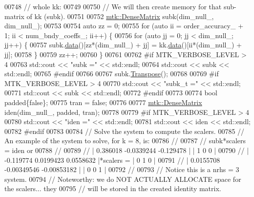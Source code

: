 \begin{DoxyCode}
{{00748   \textcolor{comment}{// whole kk:}
00749 
00750   \textcolor{comment}{// We will then create memory for that sub-matrix of kk (subk).}
00751 
00752   \hyperlink{classmtk_1_1DenseMatrix}{mtk::DenseMatrix} subk(dim\_null\_, dim\_null\_);
00753 
00754   \textcolor{keyword}{auto} zz = 0;
00755   \textcolor{keywordflow}{for} (\textcolor{keyword}{auto} ii = order\_accuracy\_ + 1; ii < num\_bndy\_coeffs\_; ii++) \{
00756     \textcolor{keywordflow}{for} (\textcolor{keyword}{auto} jj = 0; jj < dim\_null\_; jj++) \{
00757       subk.\hyperlink{classmtk_1_1DenseMatrix_a0c33b8a9e01d157c61ddbdf807c25d84}{data}()[zz*(dim\_null\_) + jj] = kk.\hyperlink{classmtk_1_1DenseMatrix_a0c33b8a9e01d157c61ddbdf807c25d84}{data}()[ii*(dim\_null\_) + jj];
00758     \}
00759     zz++;
00760   \}
00761 
00762 \textcolor{preprocessor}{  #if MTK\_VERBOSE\_LEVEL > 4}
00763   std::cout << \textcolor{stringliteral}{"subk ="} << std::endl;
00764   std::cout << subk << std::endl;
00765 \textcolor{preprocessor}{  #endif}
00766 
00767   subk.\hyperlink{classmtk_1_1DenseMatrix_a71d9c07ca66e88d97d1fd5012f43138b}{Transpose}();
00768 
00769 \textcolor{preprocessor}{  #if MTK\_VERBOSE\_LEVEL > 4}
00770   std::cout << \textcolor{stringliteral}{"subk\_t ="} << std::endl;
00771   std::cout << subk << std::endl;
00772 \textcolor{preprocessor}{  #endif}
00773 
00774   \textcolor{keywordtype}{bool} padded\{\textcolor{keyword}{false}\};
00775   tran = \textcolor{keyword}{false};
00776 
00777   \hyperlink{classmtk_1_1DenseMatrix}{mtk::DenseMatrix} iden(dim\_null\_, padded, tran);
00778 
00779 \textcolor{preprocessor}{  #if MTK\_VERBOSE\_LEVEL > 4}
00780   std::cout << \textcolor{stringliteral}{"iden ="} << std::endl;
00781   std::cout << iden << std::endl;
00782 \textcolor{preprocessor}{  #endif}
00783 
00784   \textcolor{comment}{// Solve the system to compute the scalers.}
00785   \textcolor{comment}{// An example of the system to solve, for k = 8, is:}
00786   \textcolor{comment}{//}
00787   \textcolor{comment}{// subk*scalers = iden or}
00788   \textcolor{comment}{//}
00789   \textcolor{comment}{// |  0.386018  -0.0339244   -0.129478 |           | 1 0 0 |}
00790   \textcolor{comment}{// | -0.119774   0.0199423   0.0558632 |*scalers = | 0 1 0 |}
00791   \textcolor{comment}{// | 0.0155708 -0.00349546 -0.00853182 |           | 0 0 1 |}
00792   \textcolor{comment}{//}
00793   \textcolor{comment}{// Notice this is a nrhs = 3 system.}
00794   \textcolor{comment}{// Noteworthy: we do NOT ACTUALLY ALLOCATE space for the scalers... they}
00795   \textcolor{comment}{// will be stored in the created identity matrix.}
}}
\end{DoxyCode}
